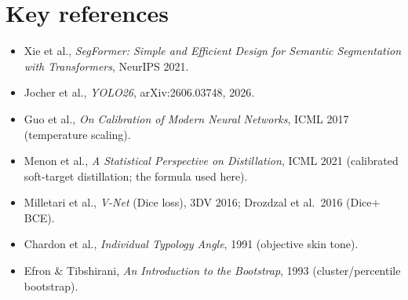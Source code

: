 \documentclass[11pt]{article}
\begin{document}
\section*{Key references}
\small
\sloppy
\begin{itemize}[leftmargin=1.4em, itemsep=1pt]
\item Xie et al., \emph{SegFormer: Simple and Efficient Design for Semantic
      Segmentation with Transformers}, NeurIPS 2021.
\item Jocher et al., \emph{YOLO26}, arXiv:2606.03748, 2026.
\item Guo et al., \emph{On Calibration of Modern Neural Networks}, ICML 2017
      (temperature scaling).
\item Menon et al., \emph{A Statistical Perspective on Distillation}, ICML 2021
      (calibrated soft-target distillation; the formula used here).
\item Milletari et al., \emph{V-Net} (Dice loss), 3DV 2016; Drozdzal et al.\ 2016
      (Dice$+$BCE).
\item Chardon et al., \emph{Individual Typology Angle}, 1991 (objective skin tone).
\item Efron \& Tibshirani, \emph{An Introduction to the Bootstrap}, 1993
      (cluster/percentile bootstrap).
\end{itemize}
\end{document}
